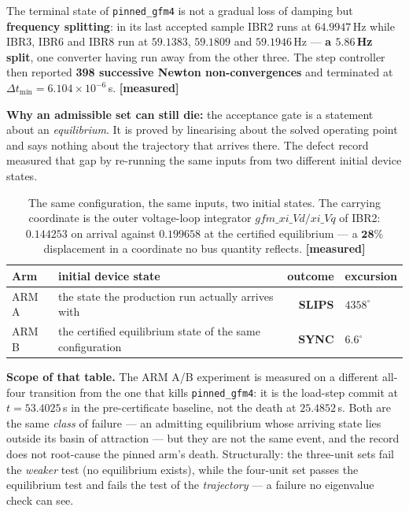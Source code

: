 \documentclass[11pt,a4paper]{article}
\newcommand{\code}[1]{\texttt{\small #1}}
\newcommand{\mes}{\textcolor{ok}{\textbf{[measured]}}}
\begin{document}
\noindent
The terminal state of \code{pinned\_gfm4} is not a gradual loss of damping but
\textbf{frequency splitting}: in its last accepted sample IBR2 runs at
$64.9947$\,Hz while IBR3, IBR6 and IBR8 run at $59.1383$, $59.1809$ and
$59.1946$\,Hz --- \textbf{a $5.86$\,Hz split}, one converter having run away from
the other three. The step controller then reported \textbf{398 successive Newton
non-convergences} and terminated at $\Delta t_{\min} = 6.104\times10^{-6}$\,s.
\mes

\textbf{Why an admissible set can still die:} the acceptance gate is a statement
about an \emph{equilibrium}. It is proved by linearising about the solved
operating point and says nothing about the trajectory that arrives there. The
defect record measured that gap by re-running the same inputs from two different
initial device states.

\begin{table}[H]
\centering\small
\begin{tabular}{@{}llrl@{}}
\toprule
\textbf{Arm} & \textbf{initial device state} & \textbf{outcome} & \textbf{excursion}\\
\midrule
ARM A & the state the production run actually arrives with & \textcolor{no}{\textbf{SLIPS}} & $4358^{\circ}$\\
ARM B & the certified equilibrium state of the same configuration & \textbf{SYNC} & $6.6^{\circ}$\\
\bottomrule
\end{tabular}
\caption{The same configuration, the same inputs, two initial states. The
carrying coordinate is the outer voltage-loop integrator
$gfm\_xi\_Vd/xi\_Vq$ of IBR2: $0.144253$ on arrival against $0.199658$ at the
certified equilibrium --- a $\mathbf{28\%}$ displacement in a coordinate no bus
quantity reflects. \mes}
\end{table}

\noindent
\textbf{Scope of that table.} The ARM A/B experiment is measured on a different
all-four transition from the one that kills \code{pinned\_gfm4}: it is the
load-step commit at $t = 53.4025$\,s in the pre-certificate baseline, not the
death at $25.4852$\,s. Both are the same \emph{class} of failure --- an admitting
equilibrium whose arriving state lies outside its basin of attraction --- but they
are not the same event, and the record does not root-cause the pinned arm's death.
Structurally: the three-unit sets fail the \emph{weaker} test (no equilibrium
exists), while the four-unit set passes the equilibrium test and fails the test of
the \emph{trajectory} --- a failure no eigenvalue check can see.
\end{document}

